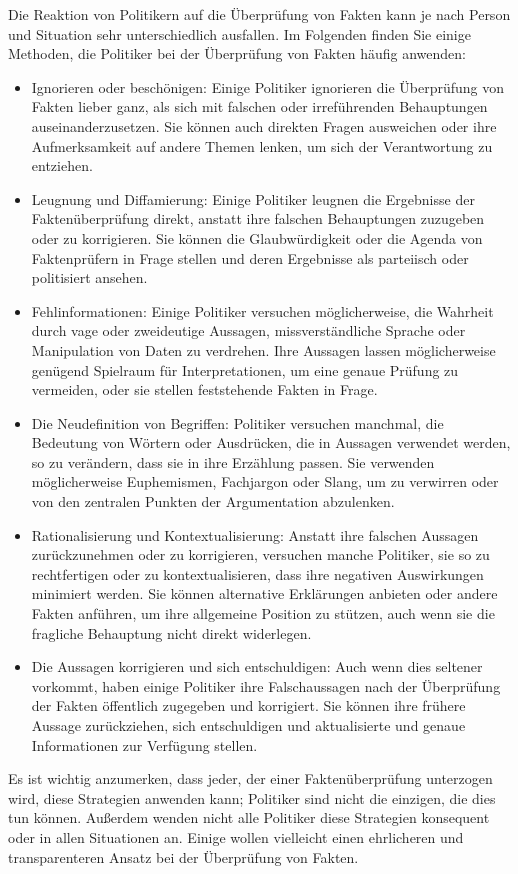 \documentclass[a4paper,listof=totoc,bibliography=totoc]{scrartcl}
\begin{document}
Die Reaktion von Politikern auf die Überprüfung von Fakten kann je nach Person und Situation sehr unterschiedlich ausfallen. Im Folgenden finden Sie einige Methoden, die 
Politiker bei der Überprüfung von Fakten häufig anwenden:

\begin{itemize}
    \item Ignorieren oder beschönigen:  Einige Politiker ignorieren die Überprüfung von Fakten lieber ganz, als sich mit falschen oder irreführenden Behauptungen 
    auseinanderzusetzen. Sie können auch direkten Fragen ausweichen oder ihre Aufmerksamkeit auf andere Themen lenken, um sich der Verantwortung zu entziehen. 
    \item Leugnung und Diffamierung: Einige Politiker leugnen die Ergebnisse der Faktenüberprüfung direkt, anstatt ihre falschen Behauptungen zuzugeben oder zu korrigieren. 
    Sie können die Glaubwürdigkeit oder die Agenda von Faktenprüfern in Frage stellen und deren Ergebnisse als parteiisch oder politisiert ansehen. 
    \item Fehlinformationen: Einige Politiker versuchen möglicherweise, die Wahrheit durch vage oder zweideutige Aussagen, missverständliche Sprache oder Manipulation von 
    Daten zu verdrehen. Ihre Aussagen lassen möglicherweise genügend Spielraum für Interpretationen, um eine genaue Prüfung zu vermeiden, oder sie stellen feststehende Fakten in Frage.
    \item Die Neudefinition von Begriffen: Politiker versuchen manchmal, die Bedeutung von Wörtern oder Ausdrücken, die in Aussagen verwendet werden, so zu verändern, 
    dass sie in ihre Erzählung passen. Sie verwenden möglicherweise Euphemismen, Fachjargon oder Slang, um zu verwirren oder von den zentralen Punkten der Argumentation abzulenken. 
    \item Rationalisierung und Kontextualisierung: Anstatt ihre falschen Aussagen zurückzunehmen oder zu korrigieren, versuchen manche Politiker, sie so zu rechtfertigen 
    oder zu kontextualisieren, dass ihre negativen Auswirkungen minimiert werden. Sie können alternative Erklärungen anbieten oder andere Fakten anführen, um ihre allgemeine 
    Position zu stützen, auch wenn sie die fragliche Behauptung nicht direkt widerlegen. 
    \item Die Aussagen korrigieren und sich entschuldigen: Auch wenn dies seltener vorkommt, haben einige Politiker ihre Falschaussagen nach der Überprüfung der Fakten öffentlich 
    zugegeben und korrigiert. Sie können ihre frühere Aussage zurückziehen, sich entschuldigen und aktualisierte und genaue Informationen zur Verfügung stellen. 
\end{itemize}
Es ist wichtig anzumerken, dass jeder, der einer Faktenüberprüfung unterzogen wird, diese Strategien anwenden kann; Politiker sind nicht die einzigen, die dies tun können. 
Außerdem wenden nicht alle Politiker diese Strategien konsequent oder in allen Situationen an. Einige wollen vielleicht einen ehrlicheren und transparenteren Ansatz bei 
der Überprüfung von Fakten.
\end{document}

